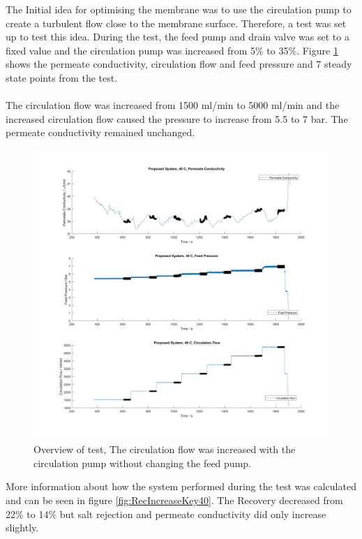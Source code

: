 The Initial idea for optimising the membrane was to use the circulation pump to create a turbulent flow close to the membrane surface. Therefore, a test was set up to test this idea.
During the test, the feed pump and drain valve was set to a fixed value and the circulation pump was increased from 5\% to 35\%. Figure \ref{fig:RecIncrease40} shows the permeate conductivity, circulation flow and feed pressure and 7 steady state points from the test.\\
\\
The circulation flow was increased from 1500 ml/min to 5000 ml/min and the increased circulation flow caused the pressure to increase from 5.5 to 7 bar. The permeate conductivity remained unchanged. 
\begin{figure}[H]
    \centering
    \includegraphics[width=1\textwidth]{RecIncrease40}
    \caption{Overview of test, The circulation flow was increased with the circulation pump without changing the feed pump.}
    \label{fig:RecIncrease40}
\end{figure}  
More information about how the system performed during the test was calculated and can be seen in figure \ref{fig:RecIncreaseKey40}. The Recovery decreased from 22\% to 14\%  but salt rejection and permeate conductivity did only increase slightly. \\
\\

